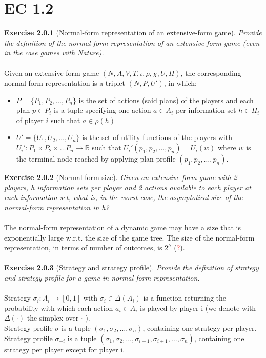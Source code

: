 \section{EC 1.2}
\textbf{Exercise 2.0.1} (Normal-form representation of an extensive-form game). \textit{Provide the definition of the normal-form
representation of an extensive-form game (even in the case games with Nature).}\\\\
Given an extensive-form game $(N, A, V, T, \iota, \rho, \chi,U,H)$, the corresponding normal-form representation is a triplet $(N, P,U')$, in which:
\begin{itemize}
\item $P = \{P_1, P_2, \ldots , P_n\}$ is the set of actions (said plans) of the players and each plan $p \in P_i$ is a tuple specifying one action $a \in A_i$ per information set $h \in H_i$ of player $i$ such that $a \in \rho(h)$
\item $U' = \{U_1,U_2, \ldots ,U_n\}$ is the set of utility functions of the players with $U_i' : P_1 \times  P_2 \times \ldots  P_n \rightarrow \mathbb{R}$ such that $U_i'(p_1, p_2, \ldots, p_n) = U_i(w)$ where $w$ is the terminal node reached by applying plan profile $(p_1, p_2, \ldots, p_n)$.
\end{itemize}
\textbf{Exercise 2.0.2} (Normal-form size). \textit{Given an extensive-form game with 2 players, h information sets per player and 2 actions available to each player at each information set, what is, in the worst case, the asymptotical size of the normal-form representation in h?}\\\\
The normal-form representation of a dynamic game may have a size that is exponentially large w.r.t. the size of the game tree. The size of the normal-form representation, in terms of number of outcomes, is $ 2^h $ (\textcolor{red}{?}).\\\\
\textbf{Exercise 2.0.3} (Strategy and strategy profile). \textit{Provide the definition of strategy and strategy profile for a game
in normal-form representation.}\\\\
Strategy $ \sigma_{i}: A_{i} \rightarrow [0,1] $ with $ \sigma_{i} \in \Delta (A_{i}) $ is a function returning the probability with which each action $ a_{i} \in A_{i} $ is played by player i (we denote with $ \Delta(\cdot) $ the simplex over $ \cdot $ ).\\
Strategy profile $ \sigma $ is a tuple $ (\sigma_{1}, \sigma_{2}, \ldots, \sigma_{n}) $, containing one strategy per player. Strategy profile $ \sigma_{-i} $ is a tuple $ (\sigma_{1}, \sigma_{2}, \ldots, \sigma_{i-1}, \sigma_{i+1}, \ldots, \sigma_{n} ) $, containing one strategy per player except for player i.\\\\
